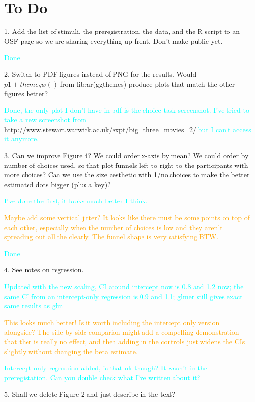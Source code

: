 \documentclass[12pt, a4paper]{article}
\newcommand{\AT}[1] {{\textcolor{cyan}{#1}}}
\newcommand{\TM}[1] {{\textcolor{orange}{#1}}}
\begin{document}
\section{To Do}


1. Add the list of stimuli, the preregistration, the data, and the R script to an OSF page so we are sharing everything up front. Don't make public yet. 


\AT{Done}


2. Switch to PDF figures instead of PNG for the results. Would $p1 + theme_bw()$ from librar(ggthemes) produce plots that match the other figures better?

\AT{Done, the only plot I don't have in pdf is the choice task screenshot. I've tried to take a new screenshot from \url{http://www.stewart.warwick.ac.uk/expt/big_three_movies_2/} but I can't access it anymore.}

3. Can we improve Figure 4? We could order x-axis by mean? We could order by number of choices used, so that plot funnels left to right to the participants with more choices? Can we use the size aesthetic with 1/no.choices to make the better estimated dots bigger (plus a key)?

\AT{I've done the first, it looks much better I think.}

\TM{Maybe add some vertical jitter? It looks like there must be some points on top of each other, especially when the number of choices is low and they aren't spreading out all the clearly. The funnel shape is very satisfying BTW.}


\AT{Done}

4. See notes on regression.

\AT{Updated with the new scaling, CI around intercept now is 0.8 and 1.2 now; the same CI from an intercept-only regression is 0.9 and 1.1; glmer still gives exact same results as glm}



\TM{This looks much better! Is it worth including the intercept only version alongside? The side by side comparion might add a compelling demonstration that ther is really no effect, and then adding in the controls just widens the CIs slightly without changing the beta estimate.}

\AT{Intercept-only regression added, is that ok though? It wasn't in the preregistation. Can you double check what I've written about it?}



5. Shall we delete Figure 2 and just describe in the text?
\end{document}
